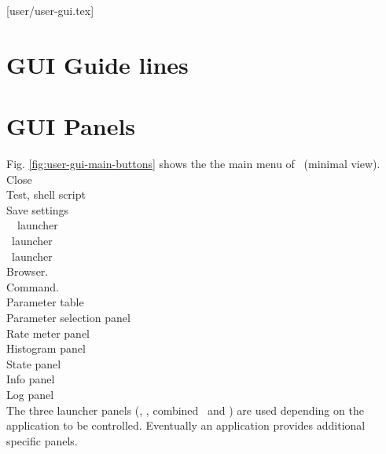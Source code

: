 [user/user-gui.tex]
\section{GUI Guide lines}
\section{GUI Panels}
Fig. \ref{fig:user-gui-main-buttons} shows the the main menu of \dabc\ (minimal view).\\
 Close\\
 Test, shell script\\
 Save settings\\
 \dabc\ \mbs\ launcher\\
 \dabc\ launcher\\
 \mbs\ launcher\\
  Browser.\\
 Command.\\
 Parameter table\\
 Parameter selection panel\\
 Rate meter panel\\
 Histogram panel\\
 State panel\\
 Info panel\\
 Log panel\\
The three launcher panels (\dabc, \mbs, combined \dabc\ and \mbs) are used depending on the
application to be controlled. Eventually an application provides additional specific panels.
